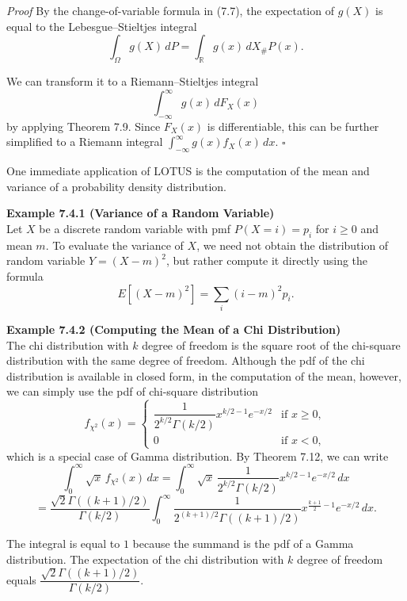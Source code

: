 \textit{Proof} By the change-of-variable formula in (7.7), the expectation of $g(X)$ is equal to the Lebesgue--Stieltjes integral
\[
\int_{\Omega} g(X)\, dP = \int_{\mathbb{R}} g(x)\, dX_{\#}P(x).
\]

We can transform it to a Riemann--Stieltjes integral
\[
\int_{-\infty}^{\infty} g(x)\, dF_X(x)
\]
by applying Theorem 7.9. Since $F_X(x)$ is differentiable, this can be further simplified to a Riemann integral $\int_{-\infty}^{\infty} g(x)f_X(x)\, dx$. \hfill $\square$

One immediate application of LOTUS is the computation of the mean and variance of a probability density distribution.

\textbf{Example 7.4.1 (Variance of a Random Variable)} \\
Let $X$ be a discrete random variable with pmf $P(X=i)=p_i$ for $i\ge 0$ and mean $m$. To evaluate the variance of $X$, we need not obtain the distribution of random variable $Y=(X-m)^2$, but rather compute it directly using the formula
\[
E[(X-m)^2] = \sum_i (i-m)^2 p_i.
\]

\textbf{Example 7.4.2 (Computing the Mean of a Chi Distribution)} \\
The chi distribution with $k$ degree of freedom is the square root of the chi-square distribution with the same degree of freedom. Although the pdf of the chi distribution is available in closed form, in the computation of the mean, however, we can simply use the pdf of chi-square distribution
\[
f_{\chi^2}(x)
=
\begin{cases}
\dfrac{1}{2^{k/2}\Gamma(k/2)}x^{k/2-1}e^{-x/2} & \text{if } x\ge 0,\\
0 & \text{if } x<0,
\end{cases}
\]
which is a special case of Gamma distribution. By Theorem 7.12, we can write
\[
\int_{0}^{\infty} \sqrt{x}\, f_{\chi^2}(x)\, dx
=
\int_{0}^{\infty}
\sqrt{x}\,
\frac{1}{2^{k/2}\Gamma(k/2)}x^{k/2-1}e^{-x/2}\, dx
\]
\[
=
\frac{\sqrt{2}\Gamma((k+1)/2)}{\Gamma(k/2)}
\int_{0}^{\infty}
\frac{1}{2^{(k+1)/2}\Gamma((k+1)/2)}
x^{\frac{k+1}{2}-1}e^{-x/2}\, dx.
\]

The integral is equal to $1$ because the summand is the pdf of a Gamma distribution. The expectation of the chi distribution with $k$ degree of freedom equals $\dfrac{\sqrt{2}\Gamma((k+1)/2)}{\Gamma(k/2)}$.
